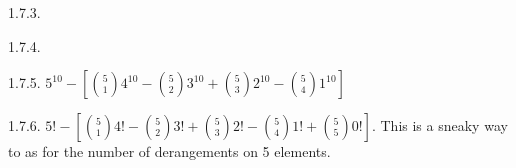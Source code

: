 \begin {itemize}
\begin{ans}{1.7.3.}
\end{ans}
\begin{ans}{1.7.4.}
	
\end{ans}
\begin{ans}{1.7.5.}
	$5^{10} - \left[{5 \choose 1}4^{10} - {5 \choose 2}3^{10} + {5 \choose 3}2^{10} - {5 \choose 4}1^{10}\right]$ %
	
\end{ans}
\begin{ans}{1.7.6.}
	$5! - \left[{5 \choose 1}4! - {5 \choose 2}3! + {5 \choose 3}2! - {5 \choose 4}1! + {5 \choose 5}0!\right]$.  This is a sneaky way to as for the number of derangements on 5 elements. %
	
\end{ans}
\protect \end {itemize}
